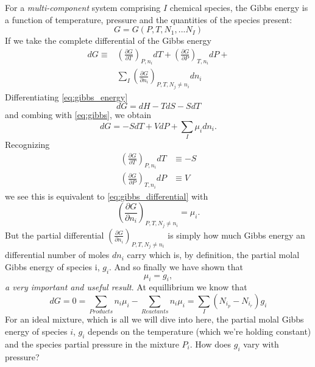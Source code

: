 \documentclass[twocolumn]{memoir} %
\begin{document}
For a \emph{multi-component} system comprising $I$ chemical species, the Gibbs energy is a function
of temperature, pressure and the quantities of the species present:
%
\begin{equation*}
    G = G(P, T, N_1,... N_I)
\end{equation*}
%
If we take the complete differential of the Gibbs energy
\begin{equation}
    \begin{split}
        dG \equiv &\left(\frac{\partial G}{\partial T}\right)_{P, n_i}dT + 
        \left(\frac{\partial G}{\partial P}\right)_{T, n_i}dP +\\
        & \sum\limits_I\left(\frac{\partial G}{\partial n_i}\right)_{P,T,N_j \neq n_i}dn_i
    \end{split}
    \label{eq:gibbs_differential}
\end{equation}
%
Differentiating \cref{eq:gibbs_energy}
\begin{equation*}
    dG = dH - TdS -SdT
\end{equation*}
%
and combing with \cref{eq:gibbs}, we obtain
%
\begin{equation*}
    dG = -SdT + VdP + \sum_I\mu_idn_i.
\end{equation*}
%
Recognizing 
\begin{equation*}
    \begin{split}
        \left(\frac{\partial G}{\partial T}\right)_{P, n_i}dT & \equiv - S \\
        \left(\frac{\partial G}{\partial P}\right)_{T, n_i}dP & \equiv V
    \end{split}
\end{equation*}
%
we see this is equivalent to \cref{eq:gibbs_differential} with
%
\begin{equation}
    \left(\frac{\partial G}{\partial n_i}\right)_{P,T,N_j \neq n_i} = \mu_i.
    \label{eq:gibbs_chem_pot}
\end{equation}
%
But the partial differential $\left(\frac{\partial G}{\partial n_i}\right)_{P,T,N_j \neq n_i}$
is simply how much Gibbs energy an differential number of moles $dn_i$ carry which is, by definition,
the partial molal Gibbs energy of species i, $g_i$.  And so finally we have shown that
\begin{equation}
    \mu_i = g_i,
\end{equation}
%
\emph{a very important and useful result}.  At equillibrium we know that 
%
\begin{equation}
    dG = 0 = \sum\limits_{Products}n_i\mu_i - \sum \limits_{Reactants}n_i\mu_i = \sum_I(N_{i_p} - N_{i_r})g_i
    \label{eq:gibbs_eq_condition}
\end{equation}
%
For an ideal mixture, which is all we will dive into here, the partial molal Gibbs energy of species $i$, 
$g_i$ depends on the temperature (which we're holding constant) and the species partial pressure
in the mixture $P_i$.  How does $g_i$ vary with pressure?
\end{document}
